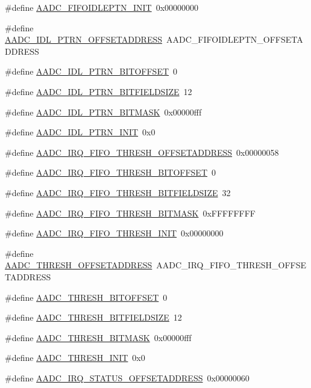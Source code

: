 \begin{DoxyCompactItemize}
\item 
\#define \hyperlink{a00543_acaccd31562863bbb7968893f79e785db}{AADC\_\-FIFOIDLEPTN\_\-INIT}~0x00000000
\item 
\#define \hyperlink{a00543_a61b80643c0b2f88aab25279f3cde444a}{AADC\_\-IDL\_\-PTRN\_\-OFFSETADDRESS}~AADC\_\-FIFOIDLEPTN\_\-OFFSETADDRESS
\item 
\#define \hyperlink{a00543_a790eb6f983b0eb3f76a5d67682f1ce5d}{AADC\_\-IDL\_\-PTRN\_\-BITOFFSET}~0
\item 
\#define \hyperlink{a00543_a329fbed6d0cfd63d422a207f8ee3e971}{AADC\_\-IDL\_\-PTRN\_\-BITFIELDSIZE}~12
\item 
\#define \hyperlink{a00543_a27f6cd2db00e589b8a26fd5f9ab1b520}{AADC\_\-IDL\_\-PTRN\_\-BITMASK}~0x00000fff
\item 
\#define \hyperlink{a00543_a1ffb605b5787343934c31d6f69cd3ce2}{AADC\_\-IDL\_\-PTRN\_\-INIT}~0x0
\item 
\#define \hyperlink{a00543_a9f6fbe05c291f4a7cabcf25720abe328}{AADC\_\-IRQ\_\-FIFO\_\-THRESH\_\-OFFSETADDRESS}~0x00000058
\item 
\#define \hyperlink{a00543_a29974ebbdde14f701f18a4e4b81ac4cd}{AADC\_\-IRQ\_\-FIFO\_\-THRESH\_\-BITOFFSET}~0
\item 
\#define \hyperlink{a00543_a5035d31b1c2d717b92a3691e7a42b144}{AADC\_\-IRQ\_\-FIFO\_\-THRESH\_\-BITFIELDSIZE}~32
\item 
\#define \hyperlink{a00543_ade1b3d4bbc8b86c34dcd58cee4a3158a}{AADC\_\-IRQ\_\-FIFO\_\-THRESH\_\-BITMASK}~0xFFFFFFFF
\item 
\#define \hyperlink{a00543_a91e2e8dbeb3ebeee728b5d42c4d7a554}{AADC\_\-IRQ\_\-FIFO\_\-THRESH\_\-INIT}~0x00000000
\item 
\#define \hyperlink{a00543_a6c6862ba38bde70a73886da0d6b11da2}{AADC\_\-THRESH\_\-OFFSETADDRESS}~AADC\_\-IRQ\_\-FIFO\_\-THRESH\_\-OFFSETADDRESS
\item 
\#define \hyperlink{a00543_a55376b32c145a1551a35f2c9212c5133}{AADC\_\-THRESH\_\-BITOFFSET}~0
\item 
\#define \hyperlink{a00543_a78967a706598ca7f4a7460f01c776376}{AADC\_\-THRESH\_\-BITFIELDSIZE}~12
\item 
\#define \hyperlink{a00543_ab1a9da6c69d39debc75ef9f355ee645d}{AADC\_\-THRESH\_\-BITMASK}~0x00000fff
\item 
\#define \hyperlink{a00543_ad5f94aebb782638cfc98eda8c993c8d5}{AADC\_\-THRESH\_\-INIT}~0x0
\item 
\#define \hyperlink{a00543_a40d52f20165e64fa7ff8e0bdba13998d}{AADC\_\-IRQ\_\-STATUS\_\-OFFSETADDRESS}~0x00000060

\end{DoxyCompactItemize}
